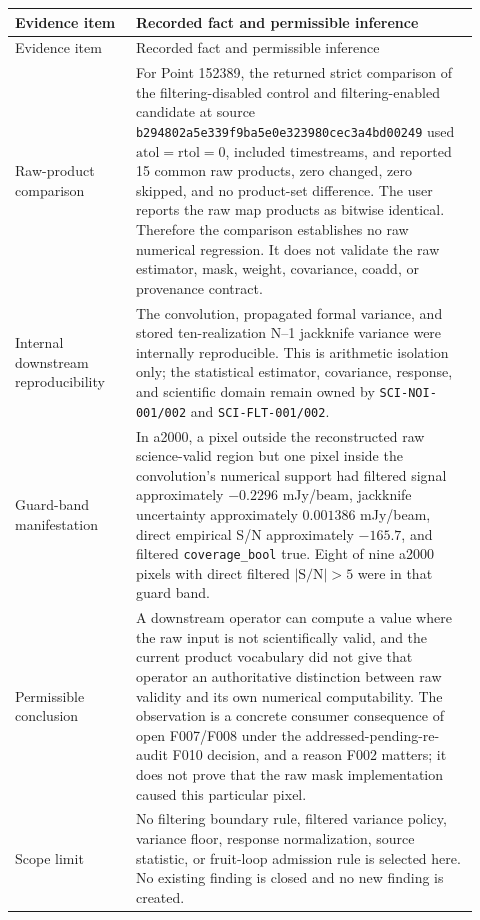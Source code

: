 \documentclass[11pt]{article}
\newcommand{\code}[1]{\nolinkurl{#1}}
\newcommand{\gitsha}[5]{\texttt{#1\allowbreak#2\allowbreak#3\allowbreak#4\allowbreak#5}}
\begin{document}
\begin{longtable}{L{0.24\linewidth}L{0.68\linewidth}}
\toprule
Evidence item & Recorded fact and permissible inference\\
\midrule
\endfirsthead
\toprule
Evidence item & Recorded fact and permissible inference\\
\midrule
\endhead
Raw-product comparison & For Point 152389, the returned strict comparison of
the filtering-disabled control and filtering-enabled candidate at source
\gitsha{b294802a}{5e339f9b}{a5e0e323}{980cec3a}{4bd00249} used
\(\mathrm{atol}=\mathrm{rtol}=0\), included timestreams, and reported 15 common
raw products, zero changed, zero skipped, and no product-set difference.  The
user reports the raw map products as bitwise identical.  Therefore the
comparison establishes no raw numerical regression.  It does not validate the
raw estimator, mask, weight, covariance, coadd, or provenance contract.\\
Internal downstream reproducibility & The convolution, propagated formal
variance, and stored ten-realization N--1 jackknife variance were internally
reproducible.  This is arithmetic isolation only; the statistical estimator,
covariance, response, and scientific domain remain owned by
\code{SCI-NOI-001/002} and \code{SCI-FLT-001/002}.\\
Guard-band manifestation & In a2000, a pixel outside the reconstructed raw
science-valid region but one pixel inside the convolution's numerical support
had filtered signal approximately \(-0.2296\) mJy/beam, jackknife uncertainty
approximately \(0.001386\) mJy/beam, direct empirical S/N approximately
\(-165.7\), and filtered \code{coverage_bool} true.  Eight of nine a2000
pixels with direct filtered \(|\mathrm{S/N}|>5\) were in that guard band.\\
Permissible conclusion & A downstream operator can compute a value where the
raw input is not scientifically valid, and the current product vocabulary did
not give that operator an authoritative distinction between raw validity and
its own numerical computability.  The observation is a concrete consumer
consequence of open F007/F008 under the addressed-pending-re-audit F010
decision, and a reason F002 matters; it does not prove
that the raw mask implementation caused this particular pixel.\\
Scope limit & No filtering boundary rule, filtered variance policy, variance
floor, response normalization, source statistic, or fruit-loop admission rule
is selected here.  No existing finding is closed and no new finding is
created.\\
\bottomrule
\end{longtable}
\end{document}
